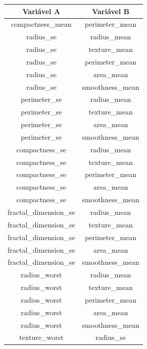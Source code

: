 \documentclass[11pt,a4paper]{article}
\numberwithin{equation}{section}
\begin{document}
\begin{table}[H]
\centering
\begin{tabular}{c|c}
\hline
Variável A                & Variável B             \\
\hline
compactness\_mean         & perimeter\_mean        \\
radius\_se                & radius\_mean           \\
radius\_se                & texture\_mean          \\
radius\_se                & perimeter\_mean        \\
radius\_se                & area\_mean             \\
radius\_se                & smoothness\_mean       \\
perimeter\_se             & radius\_mean           \\
perimeter\_se             & texture\_mean          \\
perimeter\_se             & area\_mean             \\
perimeter\_se             & smoothness\_mean       \\
compactness\_se           & radius\_mean           \\
compactness\_se           & texture\_mean          \\
compactness\_se           & perimeter\_mean        \\
compactness\_se           & area\_mean             \\
compactness\_se           & smoothness\_mean       \\
fractal\_dimension\_se    & radius\_mean           \\
fractal\_dimension\_se    & texture\_mean          \\
fractal\_dimension\_se    & perimeter\_mean        \\
fractal\_dimension\_se    & area\_mean             \\
fractal\_dimension\_se    & smoothness\_mean       \\
radius\_worst             & radius\_mean           \\
radius\_worst             & texture\_mean          \\
radius\_worst             & perimeter\_mean        \\
radius\_worst             & area\_mean             \\
radius\_worst             & smoothness\_mean       \\
texture\_worst            & radius\_se             \\

\end{tabular}
\end{table}
\end{document}
